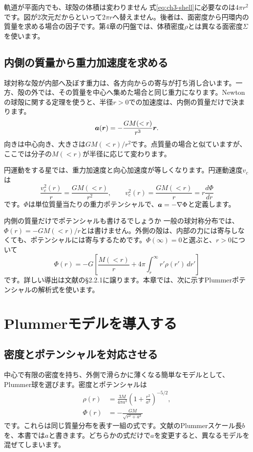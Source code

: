 \begin{failbox}{軌道が平面内でも、球殻の体積は変わりません}
式\eqref{eq:ch3-shell}に必要なのは$4\pi r^2$です。図が2次元だからといって$2\pi r$へ替えません。後者は、面密度から円環内の質量を求める場合の因子です。第4章の円盤では、体積密度$\rho$とは異なる面密度$\Sigma$を使います。
\end{failbox}

\subsection{内側の質量から重力加速度を求める}
球対称な殻が内部へ及ぼす重力は、各方向からの寄与が打ち消し合います。一方、殻の外では、その質量を中心へ集めた場合と同じ重力になります。Newtonの球殻に関する定理を使うと、半径$r>0$での加速度は、内側の質量だけで決まります。\cite{bt2008}
\begin{equation}
 \boldsymbol a(\boldsymbol r)=-\frac{G M(<r)}{r^3}\boldsymbol r.
 \label{eq:ch3-enclosed-force}
\end{equation}
向きは中心向き、大きさは$GM(<r)/r^2$です。点質量の場合と似ていますが、ここでは分子の$M(<r)$が半径に応じて変わります。

円運動をする星では、重力加速度と向心加速度が等しくなります。円運動速度$v_c$は
\begin{equation}
 \frac{v_c^2(r)}{r}=\frac{G M(<r)}{r^2},
 \qquad v_c^2(r)=\frac{G M(<r)}{r}=r\frac{d\Phi}{dr}
 \label{eq:ch3-vc-general}
\end{equation}
です。$\Phi$は単位質量当たりの重力ポテンシャルで、$\boldsymbol a=-\nabla\Phi$と定義します。

\begin{notebox}{内側の質量だけでポテンシャルも書けるでしょうか}
一般の球対称分布では、$\Phi(r)=-GM(<r)/r$とは書けません。外側の殻は、内部の力には寄与しなくても、ポテンシャルには寄与するためです。$\Phi(\infty)=0$と選ぶと、$r>0$について
\[
 \Phi(r)=-G\left[\frac{M(<r)}{r}+4\pi\int_r^\infty r'\rho(r')\,dr'\right]
\]
です。詳しい導出は文献\cite{bt2008}の\S2.2.1に譲ります。本章では、次に示すPlummerポテンシャルの解析式を使います。
\end{notebox}

\section{Plummerモデルを導入する}
\label{sec:ch3-plummer}
\subsection{密度とポテンシャルを対応させる}
中心で有限の密度を持ち、外側で滑らかに薄くなる簡単なモデルとして、Plummer球を選びます。密度とポテンシャルは
\begin{align}
 \rho(r)&=\frac{3M}{4\pi a^3}\left(1+\frac{r^2}{a^2}\right)^{-5/2},
 \label{eq:ch3-density}\\
 \Phi(r)&=-\frac{GM}{\sqrt{r^2+a^2}}
 \label{eq:ch3-potential}
\end{align}
です。これらは同じ質量分布を表す一組の式です。文献\cite{bt2008}のPlummerスケール長$b$を、本書では$a$と書きます。どちらかの式だけで$a$を変更すると、異なるモデルを混ぜてしまいます。

